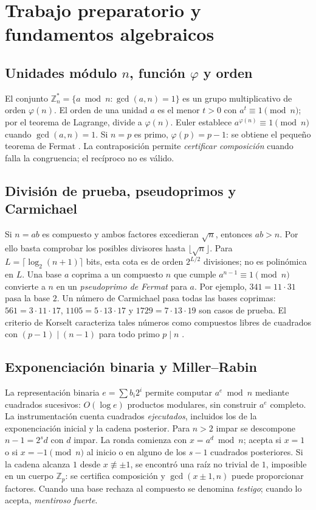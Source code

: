 \section{Trabajo preparatorio y fundamentos algebraicos}

\subsection{Unidades módulo \texorpdfstring{$n$}{n}, función \texorpdfstring{$\varphi$}{phi} y orden}
El conjunto $\mathbb{Z}_n^{*}=\{a\bmod n:\gcd(a,n)=1\}$ es un grupo multiplicativo de orden $\varphi(n)$. El orden de una unidad $a$ es el menor $t>0$ con $a^t\equiv1\pmod n$; por el teorema de Lagrange, divide a $\varphi(n)$. Euler establece $a^{\varphi(n)}\equiv1\pmod n$ cuando $\gcd(a,n)=1$. Si $n=p$ es primo, $\varphi(p)=p-1$: se obtiene el pequeño teorema de Fermat \cite{shoup,cormen}. La contraposición permite \emph{certificar composición} cuando falla la congruencia; el recíproco no es válido.

\subsection{División de prueba, pseudoprimos y Carmichael}
Si $n=ab$ es compuesto y ambos factores excedieran $\sqrt n$, entonces $ab>n$. Por ello basta comprobar los posibles divisores hasta $\lfloor\sqrt n\rfloor$. Para $L=\lceil\log_2(n+1)\rceil$ bits, esta cota es de orden $2^{L/2}$ divisiones; no es polinómica en $L$. Una base $a$ coprima a un compuesto $n$ que cumple $a^{n-1}\equiv1\pmod n$ convierte a $n$ en un \emph{pseudoprimo de Fermat} para $a$. Por ejemplo, $341=11\cdot31$ pasa la base $2$. Un número de Carmichael pasa todas las bases coprimas: $561=3\cdot11\cdot17$, $1105=5\cdot13\cdot17$ y $1729=7\cdot13\cdot19$ son casos de prueba. El criterio de Korselt caracteriza tales números como compuestos libres de cuadrados con $(p-1)\mid(n-1)$ para todo primo $p\mid n$ \cite{crandall}.

\subsection{Exponenciación binaria y Miller--Rabin}
La representación binaria $e=\sum b_i2^i$ permite computar $a^e\bmod n$ mediante cuadrados sucesivos: $O(\log e)$ productos modulares, sin construir $a^e$ completo. La instrumentación cuenta cuadrados \emph{ejecutados}, incluidos los de la exponenciación inicial y la cadena posterior. Para $n>2$ impar se descompone $n-1=2^sd$ con $d$ impar. La ronda comienza con $x=a^d\bmod n$; acepta si $x=1$ o si $x=-1\pmod n$ al inicio o en alguno de los $s-1$ cuadrados posteriores. Si la cadena alcanza $1$ desde $x\not\equiv\pm1$, se encontró una raíz no trivial de $1$, imposible en un cuerpo $\mathbb{Z}_p$: se certifica composición y $\gcd(x\pm1,n)$ puede proporcionar factores. Cuando una base rechaza al compuesto se denomina \emph{testigo}; cuando lo acepta, \emph{mentiroso fuerte}.

